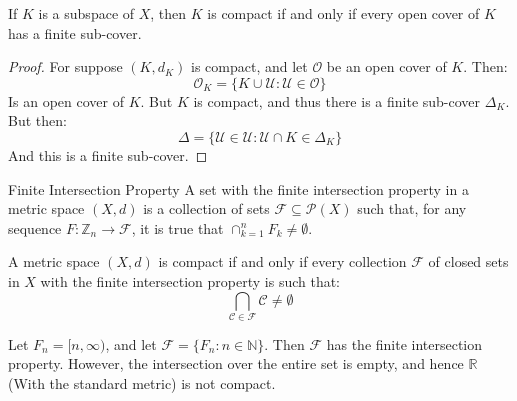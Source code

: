 \documentclass[crop=false,class=article,oneside]{standalone}
\begin{document}
            \begin{theorem}
                If $K$ is a subspace of $X$, then $K$ is compact
                if and only if every open cover of $K$ has a
                finite sub-cover.
            \end{theorem}
            \begin{proof}
                For suppose $(K,d_{K})$ is compact, and let
                $\mathcal{O}$ be an open cover of $K$. Then:
                \begin{equation}
                    \mathcal{O}_{K}=\{K\cup\mathcal{U}:
                        \mathcal{U}\in\mathcal{O}\}
                \end{equation}
                Is an open cover of $K$. But $K$ is compact,
                and thus there is a finite sub-cover
                $\Delta_{K}$. But then:
                \begin{equation}
                    \Delta=\{\mathcal{U}\in\mathcal{U}:
                             \mathcal{U}\cap{K}\in\Delta_{K}\}
                \end{equation}
                And this is a finite sub-cover.
            \end{proof}
            \begin{ldefinition}{Finite Intersection Property}
                A set with the finite intersection property
                in a metric space $(X,d)$ is a collection of sets
                $\mathscr{F}\subseteq\mathcal{P}(X)$ such that,
                for any sequence
                $F:\mathbb{Z}_{n}\rightarrow\mathscr{F}$, 
                it is true that $\cap_{k=1}^{n}F_{k}\ne\emptyset$.
            \end{ldefinition}
            \begin{theorem}
                A metric space $(X,d)$ is compact if and only if
                every collection $\mathscr{F}$ of closed sets in
                $X$ with the
                finite intersection property is such that:
                \begin{equation}
                    \bigcap_{\mathcal{C}\in\mathcal{F}}
                        \mathcal{C}\ne\emptyset
                \end{equation}
            \end{theorem}
            \begin{lexample}
                Let $F_{n}=[n,\infty)$, and let
                $\mathscr{F}=\{F_{n}:n\in\mathbb{N}\}$.
                Then $\mathscr{F}$ has the finite intersection
                property. However, the intersection over the
                entire set is empty, and hence $\mathbb{R}$
                (With the standard metric) is not compact.
            \end{lexample}
\end{document}
